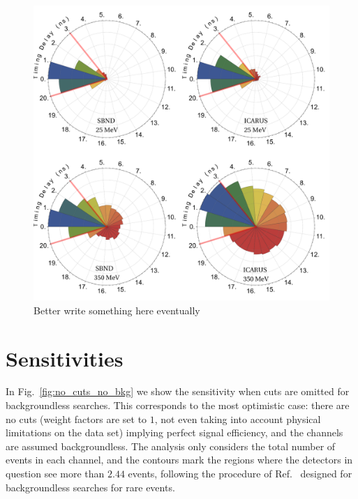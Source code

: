 \documentclass[11pt, a4paper]{article}
\newcommand{\reffig}[1]{Fig.~\ref{#1}}
\newcommand{\refref}[1]{Ref.~\cite{#1}}
\begin{document}
\begin{figure}[t]
\center
\includegraphics[width=\textwidth]{figures/timing.pdf}
\caption{\label{fig:timing} Better write something here eventually}
\end{figure}






\section{Sensitivities}

In \reffig{fig:no_cuts_no_bkg} we show the sensitivity when cuts are omitted
for backgroundless searches. This corresponds to the most optimistic case:
there are no cuts (weight factors are set to $1$, not even taking into account
physical limitations on the data set) implying perfect signal efficiency, and
the channels are assumed backgroundless.
%
The analysis only considers the total number of events in each channel, and the
contours mark the regions where the detectors in question see more than $2.44$
events, following the procedure of \refref{Feldman:1997qc} designed for
backgroundless searches for rare events. 
\end{document}
